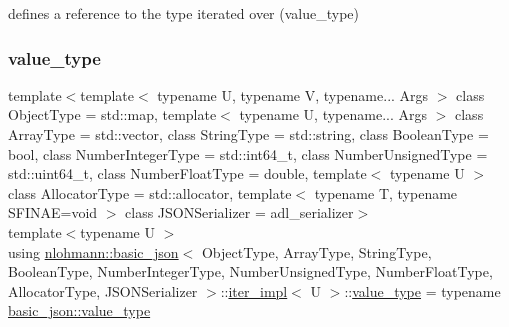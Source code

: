 defines a reference to the type iterated over (value\+\_\+type) 

\mbox{\label{classnlohmann_1_1basic__json_1_1iter__impl_a4d0518f3f2edae9dbaf7ef02f4f20add}} 
\subsubsection{\texorpdfstring{value\_type}{value\_type}}
{\footnotesize\ttfamily template$<$template$<$ typename U, typename V, typename... Args $>$ class Object\+Type = std\+::map, template$<$ typename U, typename... Args $>$ class Array\+Type = std\+::vector, class String\+Type  = std\+::string, class Boolean\+Type  = bool, class Number\+Integer\+Type  = std\+::int64\+\_\+t, class Number\+Unsigned\+Type  = std\+::uint64\+\_\+t, class Number\+Float\+Type  = double, template$<$ typename U $>$ class Allocator\+Type = std\+::allocator, template$<$ typename T, typename S\+F\+I\+N\+A\+E=void $>$ class J\+S\+O\+N\+Serializer = adl\+\_\+serializer$>$ \\
template$<$typename U $>$ \\
using \mbox{\hyperlink{classnlohmann_1_1basic__json}{nlohmann\+::basic\+\_\+json}}$<$ Object\+Type, Array\+Type, String\+Type, Boolean\+Type, Number\+Integer\+Type, Number\+Unsigned\+Type, Number\+Float\+Type, Allocator\+Type, J\+S\+O\+N\+Serializer $>$\+::\mbox{\hyperlink{classnlohmann_1_1basic__json_1_1iter__impl}{iter\+\_\+impl}}$<$ U $>$\+::\mbox{\hyperlink{classnlohmann_1_1basic__json_1_1iter__impl_a4d0518f3f2edae9dbaf7ef02f4f20add}{value\+\_\+type}} =  typename \mbox{\hyperlink{classnlohmann_1_1basic__json_a2b3297873b70c080837e8eedc4fec32f}{basic\+\_\+json\+::value\+\_\+type}}}



